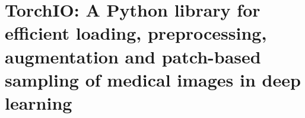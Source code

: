\chapter[TorchIO]{TorchIO: A Python library for efficient loading, preprocessing, augmentation and patch-based sampling of medical images in deep learning}
